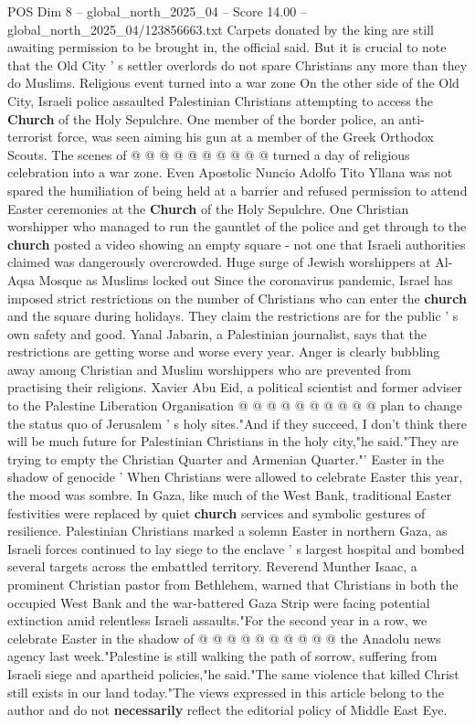 \begin{textsample}{POS Dim 8 – global\_north\_2025\_04 – Score 14.00 – global\_north\_2025\_04/123856663.txt}
Carpets donated by the king are still awaiting permission to be brought in, the official said.
But it is crucial to note that the Old City ' s settler overlords do not spare Christians any more than they do Muslims.
Religious event turned into a war zone On the other side of the Old City, Israeli police assaulted Palestinian Christians attempting to access the \textbf{Church} of the Holy Sepulchre.
One member of the border police, an anti-terrorist force, was seen aiming his gun at a member of the Greek Orthodox Scouts.
The scenes of @ @ @ @ @ @ @ @ @ @ turned a day of religious celebration into a war zone.
Even Apostolic Nuncio Adolfo Tito Yllana was not spared the humiliation of being held at a barrier and refused permission to attend Easter ceremonies at the \textbf{Church} of the Holy Sepulchre.
One Christian worshipper who managed to run the gauntlet of the police and get through to the \textbf{church} posted a video showing an empty square - not one that Israeli authorities claimed was dangerously overcrowded.
Huge surge of Jewish worshippers at Al-Aqsa Mosque as Muslims locked out Since the coronavirus pandemic, Israel has imposed strict restrictions on the number of Christians who can enter the \textbf{church} and the square during holidays.
They claim the restrictions are for the public ' s own safety and good.
Yanal Jabarin, a Palestinian journalist, says that the restrictions are getting worse and worse every year.
Anger is clearly bubbling away among Christian and Muslim worshippers who are prevented from practising their religions.
Xavier Abu Eid, a political scientist and former adviser to the Palestine Liberation Organisation @ @ @ @ @ @ @ @ @ @ plan to change the status quo of Jerusalem ' s holy sites."And if they succeed, I don't think there will be much future for Palestinian Christians in the holy city,"he said."They are trying to empty the Christian Quarter and Armenian Quarter."' Easter in the shadow of genocide ' When Christians were allowed to celebrate Easter this year, the mood was sombre.
In Gaza, like much of the West Bank, traditional Easter festivities were replaced by quiet \textbf{church} services and symbolic gestures of resilience.
Palestinian Christians marked a solemn Easter in northern Gaza, as Israeli forces continued to lay siege to the enclave ' s largest hospital and bombed several targets across the embattled territory.
Reverend Munther Isaac, a prominent Christian pastor from Bethlehem, warned that Christians in both the occupied West Bank and the war-battered Gaza Strip were facing potential extinction amid relentless Israeli assaults."For the second year in a row, we celebrate Easter in the shadow of @ @ @ @ @ @ @ @ @ @ the Anadolu news agency last week."Palestine is still walking the path of sorrow, suffering from Israeli siege and apartheid policies,"he said."The same violence that killed Christ still exists in our land today."The views expressed in this article belong to the author and do not \textbf{necessarily} reflect the editorial policy of Middle East Eye.

\end{textsample}
